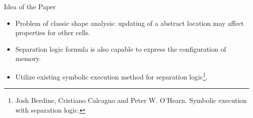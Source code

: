 \documentclass[aspectratio=1610, 13pt]{beamer}
\begin{document}

\begin{frame}{Idea of the Paper}
    
    
    
    
    \begin{itemize}
        \item Problem of classic shape analysis: updating of a abstract location may affect properties for other cells. 
        \item Separation logic formula is also capable to express the configuration of memory.
        \item Utilize existing symbolic execution method for separation logic\footnote{Josh Berdine, Cristiano Calcagno and Peter W. O’Hearn. Symbolic execution with separation logic.}.
    \end{itemize}
\end{frame}
\end{document}
